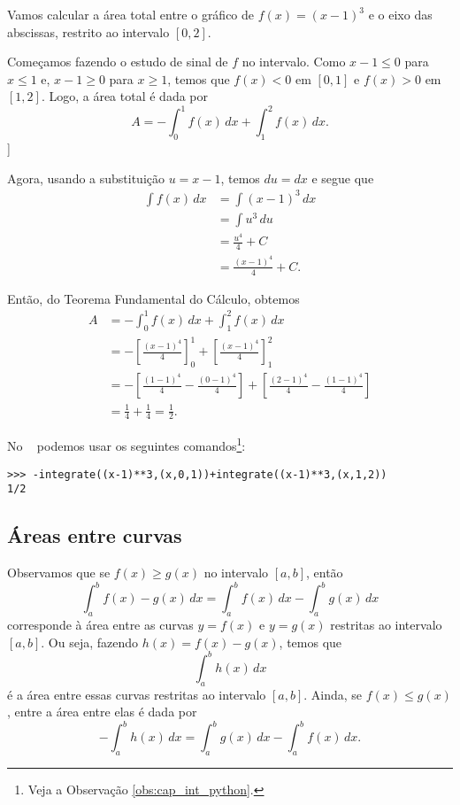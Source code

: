 \begin{ex}
  Vamos calcular a área total entre o gráfico de $f(x) = (x-1)^3$ e o eixo das abscissas, restrito ao intervalo $[0, 2]$.

  Começamos fazendo o estudo de sinal de $f$ no intervalo. Como $x-1 \leq 0$ para $x\leq1$ e, $x-1\geq 0$ para $x \geq 1$, temos que $f(x)<0$ em $[0, 1]$ e $f(x)>0$ em $[1, 2]$. Logo, a área total é dada por
  \begin{equation}
    A = -\int_0^1f(x)\,dx + \int_1^2f(x)\,dx.
  \end{equation}]
  
  Agora, usando a substituição $u=x-1$, temos $du = dx$ e segue que
  \begin{align}
    \int f(x)\,dx &= \int (x-1)^3\,dx \\
                  &= \int u^3\,du \\
                  &= \frac{u^4}{4} + C \\
                  &= \frac{(x-1)^4}{4} + C.
  \end{align}

  Então, do Teorema Fundamental do Cálculo, obtemos
  \begin{align}
    A &= -\int_0^1f(x)\,dx + \int_1^2f(x)\,dx \\
      &= -\left[\frac{(x-1)^4}{4}\right]_0^1 + \left[\frac{(x-1)^4}{4}\right]_1^2 \\
      &= -\left[\frac{(1-1)^4}{4} - \frac{(0-1)^4}{4}\right] + \left[\frac{(2-1)^4}{4} - \frac{(1-1)^4}{4}\right] \\
      &= \frac{1}{4} + \frac{1}{4} = \frac{1}{2}.
  \end{align}

  \ifispython
  No \sympy~ podemos usar os seguintes comandos\footnote{Veja a Observação \ref{obs:cap_int_python}.}:
\begin{verbatim}
>>> -integrate((x-1)**3,(x,0,1))+integrate((x-1)**3,(x,1,2))
1/2
\end{verbatim}
\fi  
\end{ex}

\subsection{Áreas entre curvas}

Observamos que se $f(x)\geq g(x)$ no intervalo $[a, b]$, então
\begin{equation}
  \int_a^b f(x)-g(x)\,dx = \int_a^bf(x)\,dx - \int_a^bg(x)\,dx
\end{equation}
corresponde à área entre as curvas $y = f(x)$ e $y = g(x)$ restritas ao intervalo $[a,b]$. Ou seja, fazendo $h(x) = f(x)-g(x)$, temos que
\begin{equation}
  \int_a^bh(x)\,dx
\end{equation}
é a área entre essas curvas restritas ao intervalo $[a, b]$. Ainda, se $f(x)\leq g(x)$, entre a área entre elas é dada por
\begin{equation}
  -\int_a^bh(x)\,dx = \int_a^bg(x)\,dx - \int_a^bf(x)\,dx.
\end{equation}

